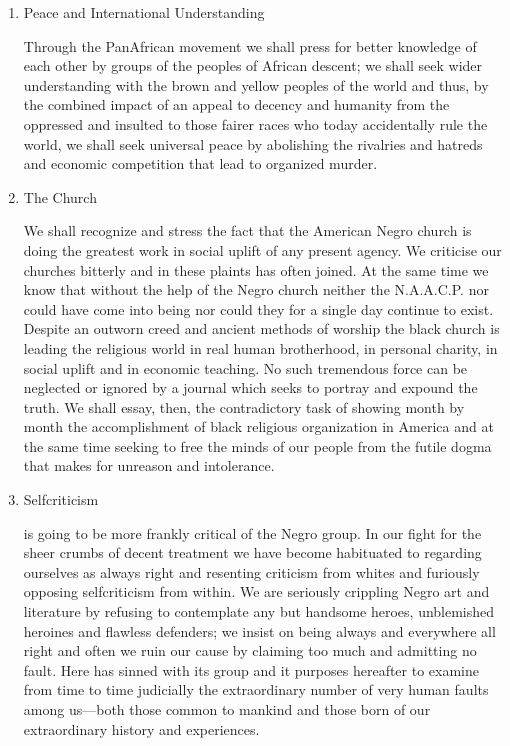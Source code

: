 \documentclass[letterpaper,10pt,english]{jupyterBook}
\begin{document}
\begin{enumerate}
\item {} 
\sphinxAtStartPar
Peace and International Understanding

\sphinxAtStartPar
Through the Pan\sphinxhyphen{}African movement we shall press for better knowledge of each other by groups of the peoples of African descent; we shall seek wider understanding with the brown and yellow peoples of the world and thus, by the combined impact of an appeal to decency and humanity from the oppressed and insulted to those fairer races who today accidentally rule the world, we shall seek universal peace by abolishing the rivalries and hatreds and economic competition that lead to organized murder.

\item {} 
\sphinxAtStartPar
The Church

\sphinxAtStartPar
We shall recognize and stress the fact that the American Negro church is doing the greatest work in social uplift of any present agency. We criticise our churches bitterly and in these plaints  has often joined. At the same time we know that without the help of the Negro church neither the N.A.A.C.P. nor  could have come into being nor could they for a single day continue to exist. Despite an outworn creed and ancient methods of worship the black church is leading the religious world in real human brotherhood, in personal charity, in social uplift and in economic teaching. No such tremendous force can be neglected or ignored by a journal which seeks to portray and expound the truth. We shall essay, then, the contradictory task of showing month by month the accomplishment of black religious organization in America and at the same time seeking to free the minds of our people from the futile dogma that makes for unreason and intolerance.

\item {} 
\sphinxAtStartPar
Self\sphinxhyphen{}criticism

\sphinxAtStartPar
{} is going to be more frankly critical of the Negro group. In our fight for the sheer crumbs of decent treatment we have become habituated to regarding ourselves as always right and resenting criticism from whites and furiously opposing self\sphinxhyphen{}criticism from within. We are seriously crippling Negro art and literature by refusing to contemplate any but handsome heroes, unblemished heroines and flawless defenders; we insist on being always and everywhere all right and often we ruin our cause by claiming too much and admitting no fault. Here  has sinned with its group and it purposes hereafter to examine from time to time judicially the extraordinary number of very human faults among us—both those common to mankind and those born of our extraordinary history and experiences.


\end{enumerate}
\end{document}
